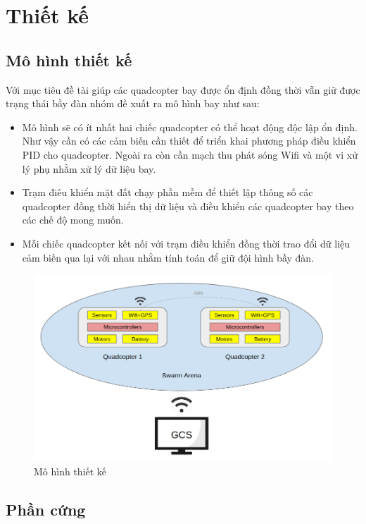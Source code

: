 \chapter{Thiết kế}

\section{Mô hình thiết kế}
    Với mục tiêu đề tài giúp các quadcopter bay được ổn định đồng thời vẫn giữ được trạng thái bầy đàn nhóm đề xuất ra mô hình bay như sau:
    \begin{itemize}
    	\item Mô hình sẽ có ít nhất hai chiếc quadcopter có thể hoạt động độc lập ổn định. Như vậy cần có các cảm biến cần thiết để triển khai phương pháp điều khiển PID cho quadcopter. Ngoài ra còn cần mạch thu phát sóng Wifi và một vi xử lý phụ nhằm xử lý dữ liệu bay.
    	\item Trạm điêu khiển mặt đất chạy phần mềm để thiết lập thông số các quadcopter đồng thời hiển thị dữ liệu và điều khiển các quadcopter bay theo các chế độ mong muốn.
    	\item Mỗi chiếc quadcopter kết nối với trạm điều khiển đồng thời trao đổi dữ liệu cảm biến qua lại với nhau nhằm tính toán để giữ đội hình bầy đàn.
    \end{itemize}
    
    \begin{figure}[h!]
    	\begin{center}
    		\includegraphics[scale=0.45]{images/design_model.png}
    		\caption{Mô hình thiết kế}
    	\end{center}
    \end{figure}
    
\section{Phần cứng} 
